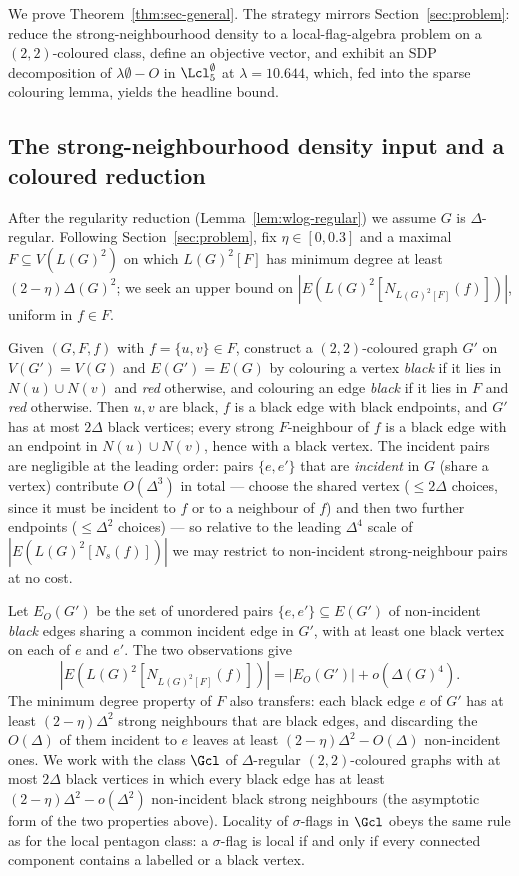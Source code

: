 \documentclass[11pt,a4paper]{article}
\theoremstyle{definition}
\theoremstyle{remark}
\begin{document}
We prove Theorem~\ref{thm:sec-general}. The strategy mirrors
Section~\ref{sec:problem}: reduce the strong-neighbourhood density to
a local-flag-algebra problem on a $(2,2)$-coloured class, define an
objective vector, and exhibit an SDP decomposition of
$\lambda \emptyset - O$ in $\Lcl^\emptyset_5$ at
$\lambda = 10.644$, which, fed into the sparse colouring lemma,
yields the headline bound.

\subsection{The strong-neighbourhood density input and a coloured reduction}

After the regularity reduction (Lemma~\ref{lem:wlog-regular}) we
assume $G$ is $\Delta$-regular. Following Section~\ref{sec:problem},
fix $\eta \in [0, 0.3]$ and a maximal $F \subseteq V(L(G)^2)$ on which
$L(G)^2[F]$ has minimum degree at least $(2 - \eta)\Delta(G)^2$; we
seek an upper bound on $|E(L(G)^2[N_{L(G)^2[F]}(f)])|$, uniform in
$f \in F$.

Given $(G, F, f)$ with $f = \{u, v\} \in F$, construct a
$(2,2)$-coloured graph $G'$ on $V(G') = V(G)$ and $E(G') = E(G)$ by
colouring a vertex \emph{black} if it lies in $N(u) \cup N(v)$ and
\emph{red} otherwise, and colouring an edge \emph{black} if it lies
in $F$ and \emph{red} otherwise. Then $u, v$ are black, $f$ is a
black edge with black endpoints, and $G'$ has at most $2\Delta$ black
vertices; every strong $F$-neighbour of $f$ is a black edge with an
endpoint in $N(u) \cup N(v)$, hence with a black vertex. The incident pairs are
negligible at the leading order: pairs $\{e, e'\}$ that are
\emph{incident} in $G$ (share a vertex) contribute $O(\Delta^3)$ in
total --- choose the shared vertex ($\leq 2\Delta$ choices, since it
must be incident to $f$ or to a neighbour of $f$) and then two
further endpoints ($\leq \Delta^2$ choices) --- so relative to the
leading $\Delta^4$ scale of $|E(L(G)^2[N_s(f)])|$ we may restrict to
non-incident strong-neighbour pairs at no cost.

Let $E_O(G')$ be the set of unordered pairs $\{e, e'\} \subseteq
E(G')$ of non-incident \emph{black} edges sharing a common incident
edge in $G'$, with at least one black vertex on each of $e$ and
$e'$. The two observations give
\begin{equation}
\label{eq:EO-bridge}
|E(L(G)^2[N_{L(G)^2[F]}(f)])|
= |E_O(G')| + o(\Delta(G)^4).
\end{equation}
The minimum degree property of $F$ also transfers: each black edge
$e$ of $G'$ has at least $(2 - \eta)\Delta^2$ strong neighbours that
are black edges, and discarding the $O(\Delta)$ of them incident to
$e$ leaves at least $(2 - \eta)\Delta^2 - O(\Delta)$ non-incident
ones. We work with the class $\Gcl$ of $\Delta$-regular
$(2,2)$-coloured graphs with at most $2\Delta$ black vertices in
which every black edge has at least $(2 - \eta)\Delta^2 -
o(\Delta^2)$ non-incident black strong neighbours (the asymptotic
form of the two properties above). Locality of
$\sigma$-flags in
$\Gcl$ obeys the same rule as for the local pentagon class: a
$\sigma$-flag is local if and only if every connected component
contains a labelled or a black vertex.
\end{document}
